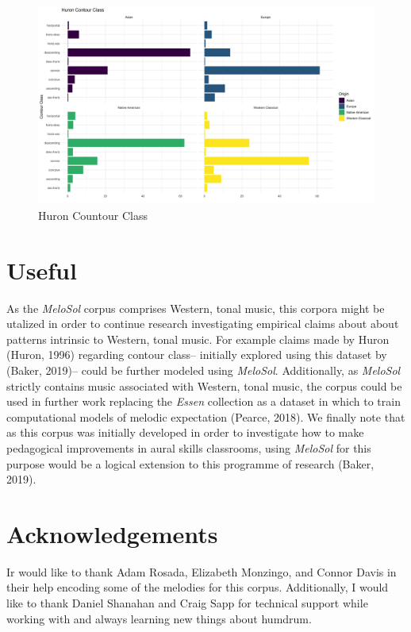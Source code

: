 \documentclass[english,man,floatsintext]{apa6}
\begin{document}
\begin{figure}
\centering
\includegraphics{../img/huron_recreation.png}
\caption{Huron Countour Class}
\end{figure}

\hypertarget{useful}{%
\section{Useful}\label{useful}}

As the \emph{MeloSol} corpus comprises Western, tonal music, this corpora might be utalized in order to continue research investigating empirical claims about about patterns intrinsic to Western, tonal music.
For example claims made by Huron (Huron, 1996) regarding contour class-- initially explored using this dataset by (Baker, 2019)-- could be further modeled using \emph{MeloSol}.
Additionally, as \emph{MeloSol} strictly contains music associated with Western, tonal music, the corpus could be used in further work replacing the \emph{Essen} collection as a dataset in which to train computational models of melodic expectation (Pearce, 2018).
We finally note that as this corpus was initially developed in order to investigate how to make pedagogical improvements in aural skills classrooms, using \emph{MeloSol} for this purpose would be a logical extension to this programme of research (Baker, 2019).

\hypertarget{acknowledgements}{%
\section{Acknowledgements}\label{acknowledgements}}

Ir would like to thank Adam Rosada, Elizabeth Monzingo, and Connor Davis in their help encoding some of the melodies for this corpus.
Additionally, I would like to thank Daniel Shanahan and Craig Sapp for technical support while working with and always learning new things about humdrum.
\end{document}
